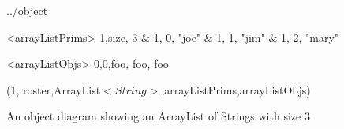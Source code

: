 \documentclass{article}
\begin{document}
\begin {figure}


\Draw

 {../object}




\Indirect \Table <arrayListPrims>
{1,size, 3	&
 1, 0, "joe"  	&
 1, 1, "jim"	&
 1, 2, "mary"	
}

\Indirect \Table <arrayListObjs>
 {  0,0,foo, foo, foo }
  


\Obj (1, roster,ArrayList$<String>$,arrayListPrims,arrayListObjs)
    
\EndDraw

\caption {An object diagram showing an ArrayList of Strings
with size 3 }

\label {fig:ArrayList3prims}

\end {figure}
\end{document}
